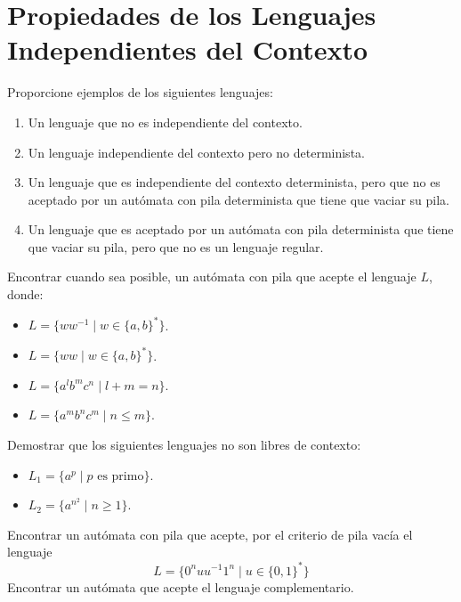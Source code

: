\newpage
\section{Propiedades de los Lenguajes Independientes del Contexto}

\begin{ejercicio}\label{ej:1.6.1}
    Proporcione ejemplos de los siguientes lenguajes:
    \begin{enumerate}[label=\alph*)]
        \item Un lenguaje que no es independiente del contexto.
        \item Un lenguaje independiente del contexto pero no determinista.
        \item Un lenguaje que es independiente del contexto determinista, pero que no es aceptado por un autómata con pila determinista que tiene que vaciar su pila.
        \item Un lenguaje que es aceptado por un autómata con pila determinista que tiene que vaciar su pila, pero que no es un lenguaje regular.
    \end{enumerate}
\end{ejercicio}

\begin{ejercicio}\label{ej:1.6.2}
    Encontrar cuando sea posible, un autómata con pila que acepte el lenguaje $L$, donde:
    \begin{itemize}
        \item $L = \{ww^{-1}\mid w\in {\{a,b\}}^{\ast}\}$.
        \item $L = \{ww\mid w \in {\{a,b\}}^{\ast}\}$.
        \item $L = \{a^l b^m c^n \mid l + m = n\}$.
        \item $L = \{a^m b^n c^m \mid n\leq m\}$.
    \end{itemize}
\end{ejercicio}

\begin{ejercicio}\label{ej:1.6.3}
    Demostrar que los siguientes lenguajes no son libres de contexto:
    \begin{itemize}
        \item $L_1 = \{a^p \mid p \text{\ es primo}\}$.
        \item $L_2 = \{a^{n^2}\mid n\geq 1\}$.
    \end{itemize}
\end{ejercicio}

\begin{ejercicio}\label{ej:1.6.4}
    Encontrar un autómata con pila que acepte, por el criterio de pila vacía el lenguaje
    \begin{equation*}
        L = \{0^n uu^{-1}1^n \mid u\in {\{0,1\}}^{\ast}\}
    \end{equation*}
    Encontrar un autómata que acepte el lenguaje complementario.
\end{ejercicio}

